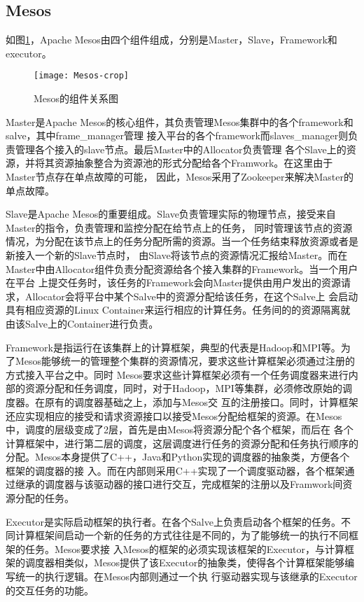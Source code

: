 \subsection{Mesos}

如图\ref{fig:mesos}，Apache Mesos由四个组件组成，分别是Master，Slave，Framework和executor。
\begin{figure}[htbp]
\centering\texttt{[image: Mesos-crop]}
\caption{Mesos的组件关系图}\label{fig:mesos}
\end{figure}

Master是Apache Mesos的核心组件，其负责管理Mesos集群中的各个framework和salve，其中frame\_manager管理
接入平台的各个framework而slaves\_manager则负责管理各个接入的slave节点。最后Master中的Allocator负责管理
各个Slave上的资源，并将其资源抽象整合为资源池的形式分配给各个Framwork。在这里由于Master节点存在单点故障的可能，
因此，Mesos采用了Zookeeper来解决Master的单点故障。

Slave是Apache Mesos的重要组成。Slave负责管理实际的物理节点，接受来自Master的指令，负责管理和监控分配在给节点上的任务，
同时管理该节点的资源情况，为分配在该节点上的任务分配所需的资源。当一个任务结束释放资源或者是新接入一个新的Slave节点时，
由Slave将该节点的资源情况汇报给Master。而在Master中由Allocator组件负责分配资源给各个接入集群的Framework。当一个用户在平台
上提交任务时，该任务的Framework会向Master提供由用户发出的资源请求，Allocator会将平台中某个Salve中的资源分配给该任务，在这个Salve上
会启动具有相应资源的Linux Container来运行相应的计算任务。任务间的的资源隔离就由该Salve上的Container进行负责。

Framework是指运行在该集群上的计算框架，典型的代表是Hadoop和MPI等。为了Mesos能够统一的管理整个集群的资源情况，要求这些计算框架必须通过注册的方式接入平台之中。同时
Mesos要求这些计算框架必须有一个任务调度器来进行内部的资源分配和任务调度\cite{ref15}，同时，对于Hadoop，MPI等集群，必须修改原始的调度器。在原有的调度器基础之上，添加与Mesos交
互的注册接口。同时，计算框架还应实现相应的接受和请求资源接口以接受Mesos分配给框架的资源。在Mesos中，调度的层级变成了2层，首先是由Mesos将资源分配个各个框架，而后在
各个计算框架中，进行第二层的调度，这层调度进行任务的资源分配和任务执行顺序的分配。Mesos本身提供了C++，Java和Python实现的调度器的抽象类，方便各个框架的调度器的接
入。而在内部则采用C++实现了一个调度驱动器，各个框架通过继承的调度器与该驱动器的接口进行交互，完成框架的注册以及Framwork间资源分配的任务。

Executor是实际启动框架的执行者。在各个Salve上负责启动各个框架的任务。不同计算框架间启动一个新的任务的方式往往是不同的，为了能够统一的执行不同框架的任务。Mesos要求接
入Mesos的框架的必须实现该框架的Executor，与计算框架的调度器相类似，Mesos提供了该Executor的抽象类，使得各个计算框架能够编写统一的执行逻辑。在Mesos内部则通过一个执
行驱动器实现与该继承的Executor的交互任务的功能。

